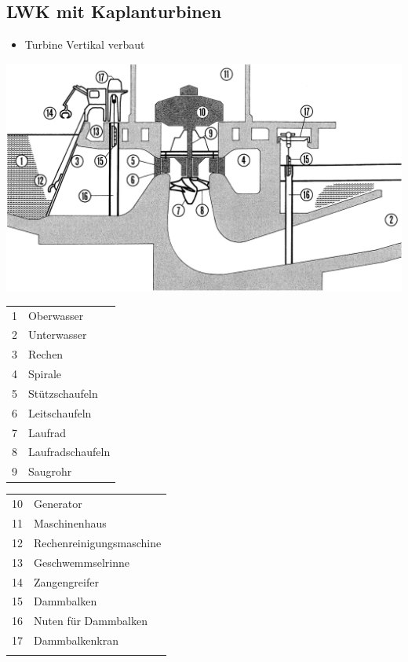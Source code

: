 \subsection{LWK mit Kaplanturbinen}

\begin{itemize}
    \item Turbine Vertikal verbaut
\end{itemize}

\begin{center}
    \includegraphics[width=0.95\columnwidth, align=c]{images/Laufwasserkraftwerke_Kaplanturbine_Vertikal.png}
\end{center}

\begin{minipage}[t]{0.38\columnwidth}
    \begin{tabular}{c l}
        1 & Oberwasser \\
        2 & Unterwasser \\
        3 & Rechen \\
        4 & Spirale \\
        5 & Stützschaufeln \\
        6 & Leitschaufeln \\
        7 & Laufrad \\
        8 & Laufradschaufeln \\
        9 & Saugrohr \\
    \end{tabular}
\end{minipage}
\hfill
\begin{minipage}[t]{0.58\columnwidth}
    \begin{tabular}{c l}
        10 & Generator \\
        11 & Maschinenhaus \\
        12 & Rechenreinigungsmaschine \\
        13 & Geschwemmselrinne \\
        14 & Zangengreifer \\
        15 & Dammbalken \\
        16 & Nuten für Dammbalken \\
        17 & Dammbalkenkran \\
           &  \\
    \end{tabular}
\end{minipage}



